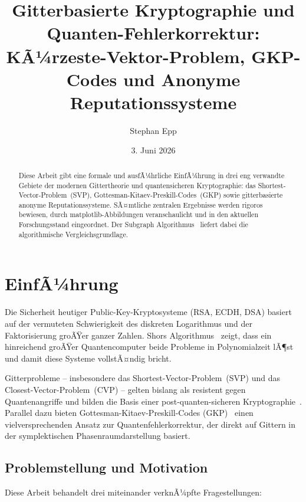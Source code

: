 ﻿\documentclass[a4paper,12pt]{article}
\title{\textbf{Gitterbasierte Kryptographie und Quanten-Fehlerkorrektur:}\\
\large KÃ¼rzeste-Vektor-Problem, GKP-Codes und Anonyme Reputationssysteme}
\author{Stephan Epp}
\date{3. Juni 2026}
\theoremstyle{definition}
\begin{document}
\maketitle

\begin{abstract}
Diese Arbeit gibt eine formale und ausfÃ¼hrliche EinfÃ¼hrung in drei eng verwandte Gebiete der
modernen Gittertheorie und quantensicheren Kryptographie: das Shortest-Vector-Problem~(SVP),
Gottesman-Kitaev-Preskill-Codes~(GKP) sowie gitterbasierte anonyme Reputationssysteme.
SÃ¤mtliche zentralen Ergebnisse werden rigoros bewiesen, durch matplotlib-Abbildungen
veranschaulicht und in den aktuellen Forschungsstand eingeordnet.
Der Subgraph Algorithmus~\cite{Epp2026Subgraph} liefert dabei die algorithmische Vergleichsgrundlage.
\end{abstract}

\tableofcontents
\newpage

\section{EinfÃ¼hrung}

Die Sicherheit heutiger Public-Key-Kryptosysteme (RSA, ECDH, DSA) basiert auf
der vermuteten Schwierigkeit des diskreten Logarithmus und der Faktorisierung groÃŸer ganzer Zahlen.
Shors Algorithmus~\cite{Shor1994} zeigt, dass ein hinreichend groÃŸer Quantencomputer beide Probleme
in Polynomialzeit lÃ¶st und damit diese Systeme vollstÃ¤ndig bricht.

Gitterprobleme -- insbesondere das Shortest-Vector-Problem~(SVP) und das Closest-Vector-Problem~(CVP)
-- gelten bislang als resistent gegen Quantenangriffe und bilden die Basis einer post-quanten-sicheren
Kryptographie~\cite{Ajtai1996,Micciancio2009}.
Parallel dazu bieten Gottesman-Kitaev-Preskill-Codes (GKP)~\cite{GKP2001} einen
vielversprechenden Ansatz zur Quantenfehlerkorrektur, der direkt auf Gittern in der
symplektischen Phasenraumdarstellung basiert.

\subsection{Problemstellung und Motivation}

Diese Arbeit behandelt drei miteinander verknÃ¼pfte Fragestellungen:
\end{document}

